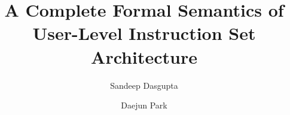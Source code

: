 \documentclass[sigplan,screen]{acmart}
\begin{document}


%
\title[A Complete Formal Semantics of x86-64 User-Level \ldots]{A Complete Formal Semantics of \ISA User-Level Instruction Set Architecture}

%


\author{Sandeep Dasgupta}

\author{Daejun Park}
\end{document}
